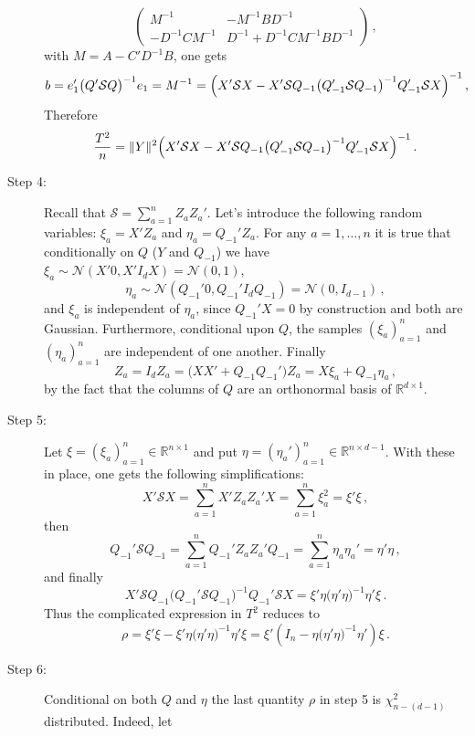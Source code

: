 \documentclass[a4paper,14pt]{article}
\newcommand{\Ncal}{\mathcal{N}}
\newcommand{\Scal}{\mathcal{S}}
\newcommand{\Real}{\mathbb{R}}
\begin{document}
\begin{description}
$$\begin{pmatrix}
            M^{-1} & - M^{-1} B D^{-1}\\
            - D^{-1} C M^{-1} & D^{-1} + D^{-1} C M^{-1} B D^{-1}
        \end{pmatrix}
        \,,$$
    with $M = A - C'D^{-1}B$, one gets
    $$ b
        = e_1' \bigl(Q' \Scal Q\bigr)^{-1} e_1
        = M^{-1}
        = \Bigl(X' \Scal X - X' \Scal Q_{-1} \bigl(Q_{-1}' \Scal Q_{-1}\bigr)^{-1} Q_{-1}' \Scal X \Bigr)^{-1}
        \,, $$
    Therefore
    $$ \frac{T^2}{n}
        = \|Y\|^2 \Bigl(
            X' \Scal X
            - X' \Scal Q_{-1} \bigl(Q_{-1}' \Scal Q_{-1}\bigr)^{-1} Q_{-1}' \Scal X
        \Bigr)^{-1}
        \,. $$
    \item[Step 4:] Recall that $\Scal = \sum_{a=1}^n Z_a Z_a'$. Let's introduce
    the following random variables: $\xi_a = X'Z_a$ and $\eta_a = Q_{-1}' Z_a$.
    For any $a=1,\ldots, n$ it is true that conditionally on $Q$ ($Y$ and $Q_{-1}$)
    we have $\xi_a \sim \Ncal(X'0, X' I_d X) = \Ncal(0, 1)$,
    $$ \eta_a
        \sim \Ncal(Q_{-1}'0, Q_{-1}'I_d Q_{-1}) = \Ncal(0, I_{d-1})
        \,, $$
    and $\xi_a$ is independent of $\eta_a$, since $Q_{-1}'X = 0$ by construction and
    both are Gaussian. Furthermore, conditional upon $Q$, the samples $(\xi_a)_{a=1}^n$
    and $(\eta_a)_{a=1}^n$ are independent of one another. Finally
    $$ Z_a
        = I_d Z_a
        = \bigl(XX' + Q_{-1}Q_{-1}'\bigr) Z_a
        = X\xi_a + Q_{-1} \eta_a
        \,, $$
    by the fact that the columns of $Q$ are an orthonormal basis of $\Real^{d\times 1}$.
    \item[Step 5:] Let $\xi = (\xi_a)_{a=1}^n \in \Real^{n\times 1}$ and put
    $\eta = (\eta_a')_{a=1}^n \in \Real^{n\times d-1}$. With these in place, one
    gets the following simplifications:
    $$ X' \Scal X
        = \sum_{a=1}^n X'Z_a Z_a'X = \sum_{a=1}^n \xi_a^2
        = \xi' \xi
        \,, $$
    then
    $$ Q_{-1}' \Scal Q_{-1}
        = \sum_{a=1}^n Q_{-1}'Z_a Z_a'Q_{-1} = \sum_{a=1}^n \eta_a\eta_a'
        = \eta' \eta
        \,, $$
    and finally
    $$ X' \Scal Q_{-1} \bigl(Q_{-1}' \Scal Q_{-1}\bigr)^{-1} Q_{-1}' \Scal X
        = \xi'\eta \bigl(\eta'\eta\bigr)^{-1}\eta'\xi
        \,. $$
    Thus the complicated expression in $T^2$ reduces to
    $$ \rho
        = \xi' \xi - \xi'\eta \bigl(\eta'\eta\bigr)^{-1}\eta'\xi
        = \xi' (I_n - \eta \bigl(\eta'\eta\bigr)^{-1}\eta') \xi
        \,. $$
    \item[Step 6:] Conditional on both $Q$ and $\eta$ the last quantity $\rho$ in step 5
    is $\chi^2_{n-(d-1)}$ distributed. Indeed, let

\end{description}
\end{document}
